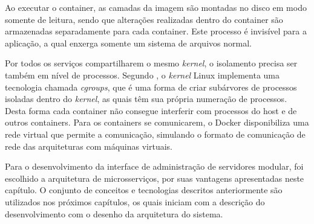 Ao executar o container, as camadas da imagem são montadas no disco em modo
somente de leitura, sendo que alterações realizadas dentro do container são
armazenadas separadamente para cada container. Este processo é invisível para
a aplicação, a qual enxerga somente um sistema de arquivos normal.

Por todos os serviços compartilharem o mesmo \emph{kernel}, o isolamento
precisa ser também em nível de processos. Segundo ,
o \emph{kernel} Linux implementa uma tecnologia chamada \emph{cgroups},
que é uma forma de criar subárvores de processos isoladas dentro
do \emph{kernel}, as quais têm sua própria numeração de processos. Desta
forma cada container não consegue interferir com processos do host e de
outros containers. Para os containers se comunicarem, o Docker
disponibiliza uma rede virtual que permite a comunicação, simulando o
formato de comunicação de rede das arquiteturas com máquinas virtuais.

Para o desenvolvimento da interface de administração de servidores modular,
foi escolhido a arquitetura de microsserviços, por suas vantagens apresentadas
neste capítulo. O conjunto de conceitos e tecnologias descritos anteriormente
são utilizados nos próximos capítulos, os quais iniciam com a descrição do
desenvolvimento com o desenho da arquitetura do sistema.
